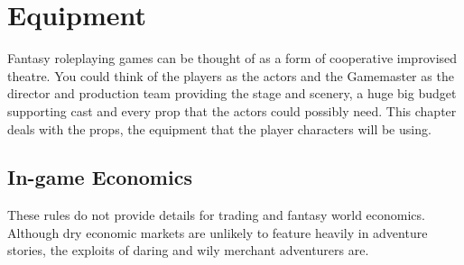 \chapter{Equipment}
\label{ch:equipment}

Fantasy roleplaying games can be thought of as a form of cooperative improvised theatre. You could think of the players as the actors and the Gamemaster as the director and production team providing the stage and scenery, a huge big budget supporting cast and every prop that the actors could possibly need. This chapter deals with the props, the equipment that the player characters will be using.

\section{In-game Economics}
These rules do not provide details for trading and fantasy world economics. Although dry economic markets are unlikely to feature heavily in adventure stories, the exploits of daring and wily merchant adventurers are. %



